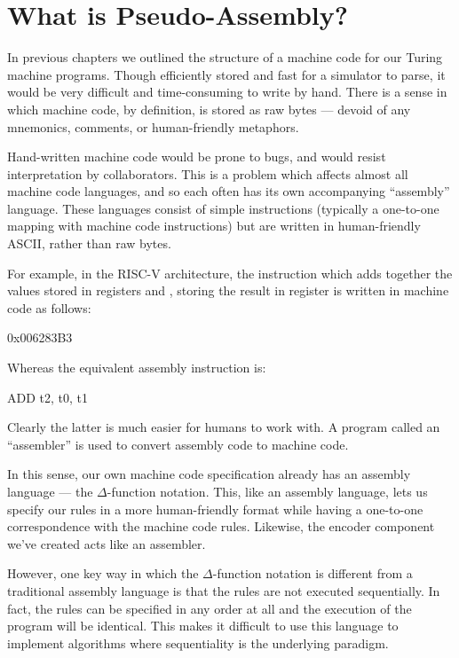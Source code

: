 \section{What is Pseudo-Assembly?}

In previous chapters we outlined the structure of a machine code for our Turing machine programs. Though efficiently stored and fast for a simulator to parse, it would be very difficult and time-consuming to write by hand. There is a sense in which machine code, by definition, is stored as raw bytes --- devoid of any mnemonics, comments, or human-friendly metaphors.

Hand-written machine code would be prone to bugs, and would resist interpretation by collaborators. This is a problem which affects almost all machine code languages, and so each often has its own accompanying ``assembly'' language. These languages consist of simple instructions (typically a one-to-one mapping with machine code instructions) but are written in human-friendly ASCII, rather than raw bytes.

For example, in the RISC-V architecture, the instruction which adds together the values stored in registers  and , storing the result in register  is written in machine code as follows:

\begin{stdout}
0x006283B3
\end{stdout}

Whereas the equivalent assembly instruction is:

\begin{stdout}
ADD t2, t0, t1
\end{stdout}

Clearly the latter is much easier for humans to work with. A program called an ``assembler'' is used to convert assembly code to machine code.

In this sense, our own machine code specification already has an assembly language --- the $\Delta$-function notation. This, like an assembly language, lets us specify our rules in a more human-friendly format while having a one-to-one correspondence with the machine code rules. Likewise, the encoder component we've created acts like an assembler.

However, one key way in which the $\Delta$-function notation is different from a traditional assembly language is that the rules are not executed sequentially. In fact, the rules can be specified in any order at all and the execution of the program will be identical. This makes it difficult to use this language to implement algorithms where sequentiality is the underlying paradigm.

